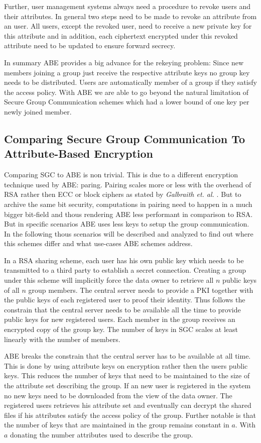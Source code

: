 Further, user management systems always need a procedure to revoke users and their attributes. 
In general two steps need to be made to revoke an attribute from an user. All users, except the revoked user, need to receive a new private key for this attribute and in addition, each ciphertext encrypted under this revoked attribute need to be updated to ensure forward secrecy. 

In summary ABE provides a big advance for the rekeying problem: Since new members joining a group just receive the respective attribute keys no group key needs to be distributed. Users are automatically member of a group if they satisfy the access policy. With \ac{ABE} we are able to go beyond the natural limitation of Secure Group Communication schemes which had a lower bound of one key per newly joined member.  

\subsection{Comparing Secure Group Communication To Attribute-Based Encryption}
Comparing \ac{SGC} to \ac{ABE} is non trivial. This is due to a different encryption technique used by \ac{ABE}: paring. Pairing scales more or less with the overhead of \ac{RSA} rather then \ac{ECC} or block ciphers as stated by \textit{Galbraith et. al.} \cite{galbraith2008pairings}. But to archive the same bit security, computations in pairing need to happen in a much bigger bit-field and thous rendering \ac{ABE} less performant in comparison to \ac{RSA}. But in specific scenarios \ac{ABE} uses less keys to setup the group communication. In the following thous scenarios will be described and analyzed to find out where this schemes differ and what use-cases \ac{ABE} schemes address.

In a \ac{RSA} sharing scheme, each user has his own public key which needs to be transmitted to a third party to establish a secret connection. Creating a group under this scheme will implicitly force the data owner to retrieve all $n$ public keys of all $n$ group members. The central server needs to provide a \ac{PKI} together with the public keys of each registered user to proof their identity. Thus follows the constrain that the central server needs to be available all the time to provide public keys for new registered users. Each member in the group receives an encrypted copy of the group key. The number of keys in \ac{SGC} scales at least linearly with the number of members. 

\ac{ABE} breaks the constrain that the central server has to be available at all time. This is done by using attribute keys on encryption rather then the users public keys. This reduces the number of keys that need to be maintained to the size of the attribute set describing the group. If an new user is registered in the system no new keys need to be downloaded from the view of the data owner. The registered users retrieves his attribute set and eventually can decrypt the shared files if his attributes satisfy the access policy of the group. Further notable is that the number of keys that are maintained in the group remains constant in $a$. With $a$ donating the number attributes used to describe the group. 

